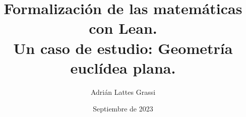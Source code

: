 \documentclass{TFG}
\title{Formalización de las matemáticas con Lean.\\ Un caso de estudio: Geometría euclídea plana.}
\date{Septiembre de 2023}
\author{Adrián Lattes Grassi}
\begin{document}
\maketitle
\emptypage



\tableofcontents
\newpage







\newpage

% 
\end{document}
